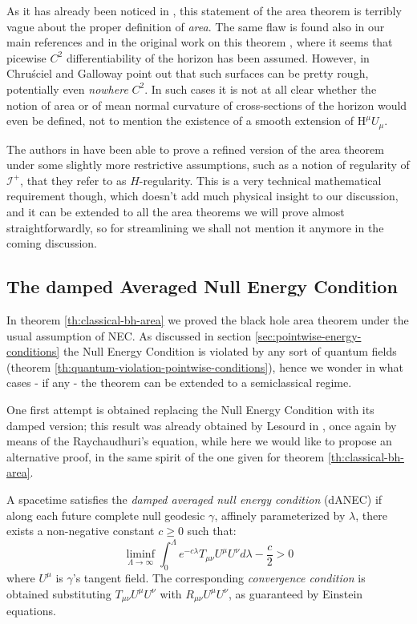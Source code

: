 \begin{remark}
	As it has already been noticed in \cite[]{chrusciel2001regularity}, this statement of the area theorem is terribly vague about the proper definition of \emph{area}. The same flaw is found also in our main references \cite[]{wald2010general, hawking1973large} and in the original work on this theorem \cite[]{hawking1972black}, where it seems that picewise \(C^2\) differentiability of the horizon has been assumed. However, in \cite[]{chrusciel1998horizons} Chru\'sciel and Galloway point out that such surfaces can be pretty rough, potentially even \emph{nowhere} \(C^2\). In such cases it is not at all clear whether the notion of area or of mean normal curvature of cross-sections of the horizon would even be defined, not to mention the existence of a smooth extension of \(\mathrm{H}^{\mu}U_{\mu}\). 

	The authors in \cite[]{chrusciel2001regularity} have been able to prove a refined version of the area theorem under some slightly more restrictive assumptions, such as a notion of regularity of \(\mathscr{I}^+\), that they refer to as \(H\)-regularity. This is a very technical mathematical requirement though, which doesn't add much physical insight to our discussion, and it can be extended to all the area theorems we will prove almost straightforwardly, so for streamlining we shall not mention it anymore in the coming discussion.
\end{remark}

\subsection{The damped Averaged Null Energy Condition}
\label{subsec:dANEC-area-theorem}
In theorem \ref{th:classical-bh-area} we proved the black hole area theorem under the usual assumption of NEC. As discussed in section \ref{sec:pointwise-energy-conditions} the Null Energy Condition is violated by any sort of quantum fields (theorem \ref{th:quantum-violation-pointwise-conditions}), hence we wonder in what cases - if any - the theorem can be extended to a semiclassical regime.

One first attempt is obtained replacing the Null Energy Condition with its damped version; this result was already obtained by Lesourd in \cite{lesourd2018remark}, once again by means of the Raychaudhuri's equation, while here we would like to propose an alternative proof, in the same spirit of the one given for theorem \ref{th:classical-bh-area}.
\begin{definition}
	A spacetime satisfies the \emph{damped averaged null energy condition} (dANEC) if along each future complete null geodesic \(\gamma\), affinely parameterized by \(\lambda\), there exists a non-negative constant \(c\ge 0\) such that:
	\[
	\liminf\limits_{\Lambda\rightarrow \infty} \int_{0}^{\Lambda} e^{-c\lambda}T_{\mu\nu}U^{\mu}U^{\nu}d\lambda - \frac{c}{2} > 0
	\]
	where \(U^{\mu}\) is \(\gamma\)'s tangent field. The corresponding \emph{convergence condition} is obtained substituting \(T_{\mu\nu}U^{\mu}U^{\nu}\) with \(R_{\mu\nu}U^{\mu}U^{\nu}\), as guaranteed by Einstein equations.
\end{definition}

